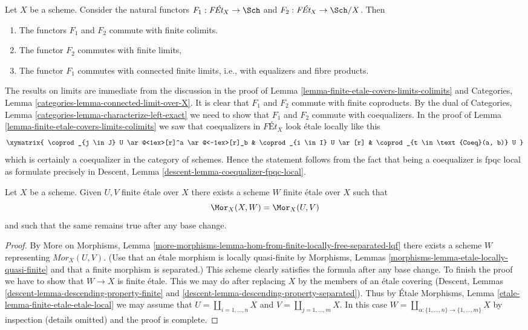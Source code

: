 \begin{remark}
\label{remark-colimits-commute-forgetful}
Let $X$ be a scheme. Consider the natural functors
$F_1 : \textit{F\'Et}_X \to \Sch$ and $F_2 : \textit{F\'Et}_X \to \Sch/X$.
Then
\begin{enumerate}
\item The functors $F_1$ and $F_2$ commute with finite colimits.
\item The functor $F_2$ commutes with finite limits,
\item The functor $F_1$ commutes with connected finite limits, i.e.,
with equalizers and fibre products.
\end{enumerate}
The results on limits are immediate from the discussion in
the proof of Lemma \ref{lemma-finite-etale-covers-limits-colimits}
and Categories, Lemma \ref{categories-lemma-connected-limit-over-X}.
It is clear that $F_1$ and $F_2$ commute with finite coproducts.
By the dual of Categories, Lemma
\ref{categories-lemma-characterize-left-exact}
we need to show that $F_1$ and $F_2$ commute with coequalizers.
In the proof of Lemma \ref{lemma-finite-etale-covers-limits-colimits}
we saw that coequalizers in $\textit{F\'Et}_X$ look \'etale locally
like this
$$
\xymatrix{
\coprod_{j \in J} U \ar@<1ex>[r]^a \ar@<-1ex>[r]_b &
\coprod_{i \in I} U \ar[r] &
\coprod_{t \in \text{Coeq}(a, b)} U
}
$$
which is certainly a coequalizer in the category of schemes.
Hence the statement follows from the fact that being a coequalizer
is fpqc local as formulate precisely in
Descent, Lemma \ref{descent-lemma-coequalizer-fpqc-local}.
\end{remark}

\begin{lemma}
\label{lemma-internal-hom-finite-etale}
Let $X$ be a scheme. Given $U, V$ finite \'etale over $X$ there
exists a scheme $W$ finite \'etale over $X$ such that
$$
\Mor_X(X, W) = \Mor_X(U, V)
$$
and such that the same remains true after any base change.
\end{lemma}

\begin{proof}
By More on Morphisms, Lemma
\ref{more-morphisms-lemma-hom-from-finite-locally-free-separated-lqf}
there exists a scheme $W$ representing $\mathit{Mor}_X(U, V)$.
(Use that an \'etale morphism is locally quasi-finite by
Morphisms, Lemmas \ref{morphisms-lemma-etale-locally-quasi-finite}
and that a finite morphism is separated.)
This scheme clearly satisfies the formula after any base change.
To finish the proof we have to show that $W \to X$ is finite \'etale.
This we may do after replacing $X$ by the members of an \'etale
covering (Descent, Lemmas \ref{descent-lemma-descending-property-finite}
and \ref{descent-lemma-descending-property-separated}).
Thus by \'Etale Morphisms, Lemma \ref{etale-lemma-finite-etale-etale-local}
we may assume that $U = \coprod_{i = 1, \ldots, n} X$
and $V = \coprod_{j = 1, \ldots, m} X$.
In this case
$W = \coprod_{\alpha : \{1, \ldots, n\} \to \{1, \ldots, m\}} X$
by inspection (details omitted) and the proof is complete.
\end{proof}

